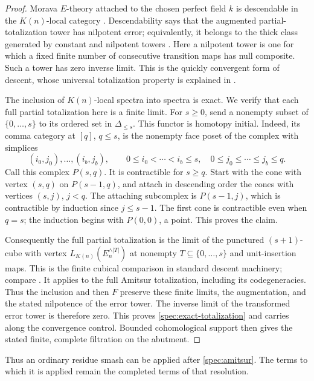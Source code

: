 \begin{proof}
Morava \(E\)-theory attached to the chosen perfect field \(k\) is
descendable in the \(K(n)\)-local category
\cite[Proposition~10.10]{Mathew}. Descendability says that the augmented
partial-totalization tower has nilpotent error; equivalently, it
belongs to the thick class generated by constant and nilpotent
towers \cite[Propositions~3.10,~3.20 and~3.27]{Mathew}. Here a nilpotent
tower is one for which a fixed finite number of consecutive transition
maps has null composite. Such a tower has zero inverse limit.
This is the quickly convergent form of descent, whose universal
totalization property is explained in
\cite[Definition~2.19 and Propositions~2.20,~2.21 and~2.26]
{MathewNilpotence}.

The inclusion of \(K(n)\)-local spectra into spectra is exact.
We verify that each full partial totalization here is a finite limit.
For \(s\geq0\), send a nonempty subset of \(\{0,\ldots,s\}\) to its
ordered set in \(\Delta_{\leq s}\). This functor is homotopy initial.
Indeed, its comma category at \([q]\), \(q\leq s\), is the nonempty
face poset of the complex with simplices
\[
(i_0,j_0),\ldots,(i_b,j_b),\qquad
0\leq i_0<\cdots<i_b\leq s,\quad
0\leq j_0\leq\cdots\leq j_b\leq q.
\]
Call this complex \(P(s,q)\). It is contractible for \(s\geq q\).
Start with the cone with vertex \((s,q)\) on \(P(s-1,q)\), and
attach in descending order the cones with vertices \((s,j)\),
\(j<q\). The attaching subcomplex is \(P(s-1,j)\), which is
contractible by induction since \(j\leq s-1\). The first cone
is contractible even when \(q=s\); the induction begins with
\(P(0,0)\), a point. This proves the claim.

Consequently the full partial totalization is the limit of the
punctured \((s+1)\)-cube with vertex
\(L_{K(n)}(E_n^{\wedge|T|})\) at nonempty
\(T\subseteq\{0,\ldots,s\}\) and unit-insertion maps.
This is the finite cubical comparison in standard descent machinery;
compare \cite[Proposition~2.14]{MNNDescent}. It applies to the full
Amitsur totalization, including its codegeneracies. Thus the inclusion
and then \(F\) preserve these finite limits, the augmentation, and
the stated nilpotence of the error tower. The inverse limit of the transformed
error tower is therefore zero. This proves
\eqref{spec:exact-totalization} and carries along the convergence
control. Bounded cohomological support then gives the stated finite,
complete filtration on the abutment.
\end{proof}

Thus an ordinary residue smash can be applied after
\eqref{spec:amitsur}. The terms to which it is applied remain the
completed terms of that resolution.

